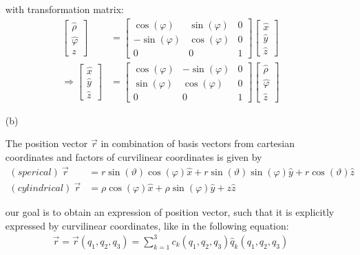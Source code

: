 \documentclass[11pt,a4paper]{article}
\begin{document}
\begin{enumerate}
with transformation matrix:
\begin{align}
\begin{bmatrix}
\hat{\rho} \\
\hat{\varphi} \\
z
\end{bmatrix}
&=
\begin{bmatrix}
\cos(\varphi) & \sin(\varphi) & 0 \\
-\sin(\varphi) & \cos(\varphi) & 0 \\
0 & 0 & 1
\end{bmatrix}
\begin{bmatrix}
\hat{x} \\
\hat{y} \\
\hat{z}
\end{bmatrix}
\\
\Rightarrow
\begin{bmatrix}
\hat{x} \\
\hat{y} \\
\hat{z}
\end{bmatrix}
&=
\begin{bmatrix}
\cos(\varphi) & -\sin(\varphi) & 0 \\
\sin(\varphi) & \cos(\varphi) & 0 \\
0 & 0 & 1
\end{bmatrix}
\begin{bmatrix}
\hat{\rho} \\
\hat{\varphi} \\
\hat{z}
\end{bmatrix}
\end{align}

\newpage

\item[(b)]

The position vector $\vec{r}$ in combination of basis vectors from cartesian coordinates and factors of curvilinear coordinates is given by
\begin{align}
(sperical)\ \vec{r}&=r\sin(\vartheta)\cos(\varphi)\hat{x}+r\sin(\vartheta)\sin(\varphi)\hat{y}+r\cos(\vartheta)\hat{z}\\
(cylindrical)\ \vec{r}&=\rho\cos(\varphi)\hat{x}+\rho\sin(\varphi)\hat{y}+z\hat{z}
\end{align}

our goal is to obtain an expression of position vector, such that it is explicitly expressed by curvilinear coordinates, like in the following equation:
\begin{align*}
\vec{r}=\vec{r}(q_1,q_2,q_3)=\sum_{k=1}^3c_k(q_1,q_2,q_3)\hat{q}_k(q_1,q_2,q_3)
\end{align*}


\end{enumerate}
\end{document}
